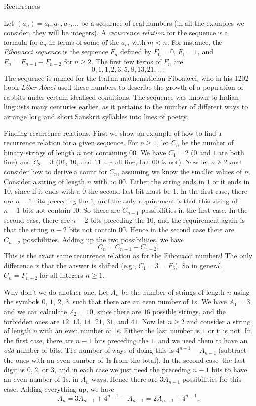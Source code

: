 \advsect Recurrences

Let $(a_n) = a_0, a_1, a_2, \ldots$ be a sequence of real numbers (in all
the examples we consider, they will be integers). A {\it recurrence relation}
for the sequence is a formula for $a_n$ in terms of some of the $a_m$ with $m<n$.
For instance, the {\it Fibonacci sequence} is the sequence $F_n$ defined by $F_0 = 0$,
$F_1 = 1$, and $F_n = F_{n-1} + F_{n-2}$ for $n\ge 2$. The first few terms of $F_n$ are
$$ 0 , 1, 1, 2, 3, 5, 8, 13, 21, \ldots.$$
The sequence is named for the Italian mathematician Fibonacci, who in his 1202 book {\sl Liber Abaci}
used these numbers to describe the growth of a population of rabbits under certain idealised
conditions. The sequence was known to Indian linguists many centuries earlier, as it pertains
to the number of different ways to arrange long and short Sanskrit syllables into lines of poetry.

\medskip\boldlabel{} Finding recurrence relations.
First we show an example of how to find a recurrence relation for a given sequence.
For $n\ge 1$, let $C_n$ be the number of binary strings of length $n$ not containing $00$.
We have $C_1 = 2$ ($0$ and $1$ are both fine) and $C_2 = 3$ ($01$, $10$, and $11$ are all fine,
but $00$ is not).
Now let $n\ge 2$ and consider how to derive a count for $C_n$, assuming
we know the smaller values of $n$. Consider a string of length $n$ with no $00$.
Either the string ends in $1$ or it ends in $10$, since if it ends with a $0$ the second-last
bit must be $1$. In the first case, there are $n-1$ bits preceding the $1$, and the only requirement
is that this string of $n-1$ bits not contain $00$. So there are $C_{n-1}$ possibilities in the
first case. In the second case, there are $n-2$ bits preceding the $10$, and the requirement
again is that the string $n-2$ bits not contain $00$. Hence in the second case there are
$C_{n-2}$ possibilities. Adding up the two possibilities, we have
$$C_n = C_{n-1} + C_{n-2}.$$
This is the exact same recurrence relation as for the Fibonacci numbers! The only difference
is that the answer is shifted (e.g., $C_1 = 3 = F_3$). So in general, $C_n = F_{n+2}$
for all integers $n\ge 1$.

Why don't we do another one. Let $A_n$ be the number of strings of length $n$ using the symbols
$0$, $1$, $2$, $3$, such that there are an even number of $1$s. We have $A_1 = 3$, and
we can calculate $A_2 = 10$, since there are $16$ possible strings, and the forbidden
ones are $12$, $13$, $14$, $21$, $31$, and $41$. Now let $n\ge 2$ and consider a
string of length $n$ with an even number of $1$s. Either the last number is $1$ or it is not.
In the first case, there are $n-1$ bits preceding the $1$, and we need them to have an {\it odd}
number of bits. The number of ways of doing this is $4^{n-1} - A_{n-1}$ (subtract the
ones with an even number of $1$s from the total). In the second case, the last digit
is $0$, $2$, or $3$, and in each case we just need the preceding $n-1$ bits to have an even
number of $1$s, in $A_n$ ways. Hence there are $3A_{n-1}$ possibilities for this case.
Adding everything up, we have
$$A_n = 3A_{n-1} + 4^{n-1} - A_{n-1} = 2A_{n-1} + 4^{n-1}.$$

